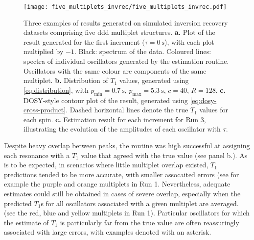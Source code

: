 \begin{figure}
    \texttt{[image: five\_multiplets\_invrec/five\_multiplets\_invrec.pdf]}
    \caption[
        Three examples of results generated on simulated inversion recovery
        datasets comprising five ddd multiplet structures.
    ]
    {
        Three examples of results generated on
        simulated inversion recovery datasets comprising five ddd multiplet
        structures.
        \textbf{a.} Plot of the result generated for the first increment ($\tau
        = \qty{0}{\second}$), with each plot multiplied by $-1$. Black:
        spectrum of the data. Coloured lines: spectra of individual oscillators
        generated by the estimation routine. Oscillators with the same colour
        are components of the same multiplet.
        \textbf{b.} Distribution of $T_1$ values, generated using
        \eqref{eq:distribution}, with
        $p_{\text{min}} = \qty{0.7}{\second}$,
        $p_{\text{max}} = \qty{5.3}{\second}$,
        $c = 40$,
        $R=128$.
        \textbf{c.} \ac{DOSY}-style contour plot of the result, generated using
        \eqref{eq:dosy-cross-product}.
        Dashed horizontal lines denote the true $T_1$ values for each spin.
        \textbf{c.} Estimation result for each increment for Run 3,
        illustrating the evolution of the amplitudes of each oscillator with
        $\tau$.
    }
    \label{fig:five-multiplets-invrec}
\end{figure}
Despite heavy overlap between peaks, the routine was high successful at
assigning each resonance with a $T_1$ value that agreed with the true value
(see panel b.). As is to be expected, in scenarios where little multiplet
overlap existed, $T_1$ predictions tended to be more accurate, with smaller
assocaited errors (see for example the purple and orange multiplets in Run 1.
Nevertheless, adequate estimates could still be obtained in cases of severe
overlap, especially when the predicted $T_1$s for all oscillators associated
with a given multiplet are averaged. (see the red, blue and yellow multiplets
in Run 1). Particular oscillators for which the estimate of $T_1$ is particularly far from the true value are often reassuringly associated with large errors, with examples denoted with an asterisk.

